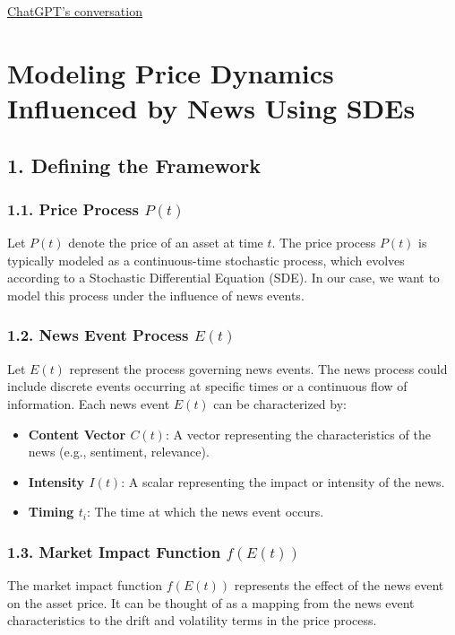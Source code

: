 \documentclass[12pt,article]{memoir}
\begin{document}
\href{https://chatgpt.com/share/56b67d2e-9d0e-4cb3-b553-81f40b76fa03}{ChatGPT's conversation}

\section*{Modeling Price Dynamics Influenced by News Using SDEs}

\subsection*{1. Defining the Framework}

\subsubsection*{1.1. Price Process \(P(t)\)}

Let \(P(t)\) denote the price of an asset at time \(t\). The price process \(P(t)\) is typically modeled as a continuous-time stochastic process, which evolves according to a Stochastic Differential Equation (SDE). In our case, we want to model this process under the influence of news events.

\subsubsection*{1.2. News Event Process \(E(t)\)}

Let \(E(t)\) represent the process governing news events. The news process could include discrete events occurring at specific times or a continuous flow of information. Each news event \(E(t)\) can be characterized by:
\begin{itemize}
    \item \textbf{Content Vector \(C(t)\)}: A vector representing the characteristics of the news (e.g., sentiment, relevance).
    \item \textbf{Intensity \(I(t)\)}: A scalar representing the impact or intensity of the news.
    \item \textbf{Timing \(t_i\)}: The time at which the news event occurs.
\end{itemize}

\subsubsection*{1.3. Market Impact Function \(f(E(t))\)}

The market impact function \(f(E(t))\) represents the effect of the news event on the asset price. It can be thought of as a mapping from the news event characteristics to the drift and volatility terms in the price process.
\end{document}
